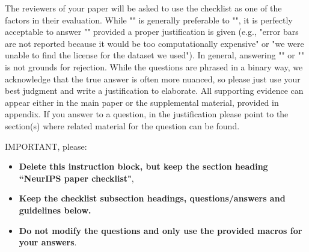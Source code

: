 \documentclass{article}
\begin{document}
The reviewers of your paper will be asked to use the checklist as one of the factors in their evaluation. While "\answerYes{}" is generally preferable to "\answerNo{}", it is perfectly acceptable to answer "\answerNo{}" provided a proper justification is given (e.g., "error bars are not reported because it would be too computationally expensive" or "we were unable to find the license for the dataset we used"). In general, answering "\answerNo{}" or "\answerNA{}" is not grounds for rejection. While the questions are phrased in a binary way, we acknowledge that the true answer is often more nuanced, so please just use your best judgment and write a justification to elaborate. All supporting evidence can appear either in the main paper or the supplemental material, provided in appendix. If you answer \answerYes{} to a question, in the justification please point to the section(s) where related material for the question can be found.

IMPORTANT, please:
\begin{itemize}
    \item {\bf Delete this instruction block, but keep the section heading ``NeurIPS paper checklist"},
    \item  {\bf Keep the checklist subsection headings, questions/answers and guidelines below.}
    \item {\bf Do not modify the questions and only use the provided macros for your answers}.
\end{itemize} 

\end{document}

